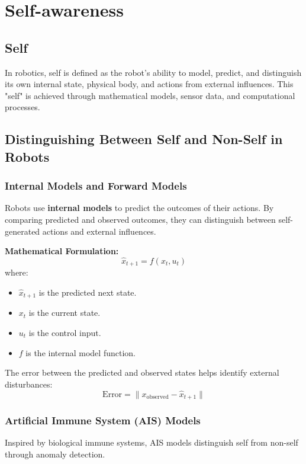 \chapter{Self-awareness}


\section{Self}
In robotics, self is defined as the robot's ability to model, predict, and distinguish its own internal state, physical body, and actions from external influences. This "self" is achieved through mathematical models, sensor data, and computational processes.


\section{Distinguishing Between Self and Non-Self in Robots}

\subsection{Internal Models and Forward Models}
Robots use \textbf{internal models} to predict the outcomes of their actions. By comparing predicted and observed outcomes, they can distinguish between self-generated actions and external influences.

\textbf{Mathematical Formulation:}
\begin{equation}
    \hat{x}_{t+1} = f(x_t, u_t)
\end{equation}
where:
\begin{itemize}
    \item \( \hat{x}_{t+1} \) is the predicted next state.
    \item \( x_t \) is the current state.
    \item \( u_t \) is the control input.
    \item \( f \) is the internal model function.
\end{itemize}
The error between the predicted and observed states helps identify external disturbances:
\begin{equation}
    \text{Error} = \| x_{\text{observed}} - \hat{x}_{t+1} \|
\end{equation}

\subsection{Artificial Immune System (AIS) Models}
Inspired by biological immune systems, AIS models distinguish self from non-self through anomaly detection.

